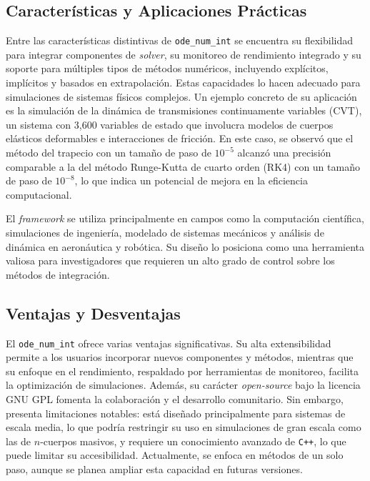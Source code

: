 \subsection{Características y Aplicaciones Prácticas}

Entre las características distintivas de \texttt{ode\_num\_int} se encuentra su flexibilidad para integrar componentes de \textit{solver}, su monitoreo de rendimiento integrado y su soporte para múltiples tipos de métodos numéricos, incluyendo explícitos, implícitos y basados en extrapolación. Estas capacidades lo hacen adecuado para simulaciones de sistemas físicos complejos. Un ejemplo concreto de su aplicación es la simulación de la dinámica de transmisiones continuamente variables (CVT), un sistema con 3,600 variables de estado que involucra modelos de cuerpos elásticos deformables e interacciones de fricción. En este caso, se observó que el método del trapecio con un tamaño de paso de \(10^{-5}\) alcanzó una precisión comparable a la del método Runge-Kutta de cuarto orden (RK4) con un tamaño de paso de \(10^{-8}\), lo que indica un potencial de mejora en la eficiencia computacional.

El \textit{framework} se utiliza principalmente en campos como la computación científica, simulaciones de ingeniería, modelado de sistemas mecánicos y análisis de dinámica en aeronáutica y robótica. Su diseño lo posiciona como una herramienta valiosa para investigadores que requieren un alto grado de control sobre los métodos de integración.

\subsection{Ventajas y Desventajas}

El \texttt{ode\_num\_int} ofrece varias ventajas significativas. Su alta extensibilidad permite a los usuarios incorporar nuevos componentes y métodos, mientras que su enfoque en el rendimiento, respaldado por herramientas de monitoreo, facilita la optimización de simulaciones. Además, su carácter \textit{open-source} bajo la licencia GNU GPL fomenta la colaboración y el desarrollo comunitario. Sin embargo, presenta limitaciones notables: está diseñado principalmente para sistemas de escala media, lo que podría restringir su uso en simulaciones de gran escala como las de \(n\)-cuerpos masivos, y requiere un conocimiento avanzado de \texttt{C++}, lo que puede limitar su accesibilidad. Actualmente, se enfoca en métodos de un solo paso, aunque se planea ampliar esta capacidad en futuras versiones.

